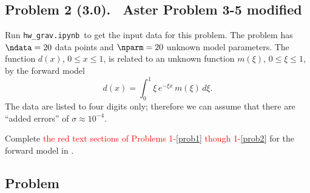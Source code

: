 \documentclass[11pt,titlepage,fleqn]{article}
\newcommand{\tfile}{{\tt hw\_grav.ipynb}}
\newcommand{\numdataA}{20}
\newcommand{\numparmA}{20}
\newcommand{\mv}{\xi}  %
\newcommand{\dv}{x}  %
\begin{document}

\pagebreak
\subsection*{Problem 2 (3.0). \ptag\ Aster Problem 3-5 modified}

Run \tfile\ to get the input data for this problem.
The problem has $\ndata = \numdataA$ data points and $\nparm = \numparmA$ unknown model parameters.
The function $d(\dv)$, $0 \le \dv \le 1$, is related to an unknown function $m(\mv)$, $0 \le \mv \le 1$, by the forward model
%
\begin{equation}
d(\dv) = \int_0^1 \mv\,e^{-\mv \dv}\,m(\mv)\,d\mv.
\label{dy}
\end{equation}
%
The data are listed to four digits only; therefore we can assume that there are ``added errors'' of $\sigma \approx 10^{-4}$.


\bigskip\noindent
Complete \textcolor{red}{the red text sections of Problems 1-\ref{prob1} though 1-\ref{prob2}} for the forward model in .



\subsection*{Problem} \howmuchtime\





\end{document}
